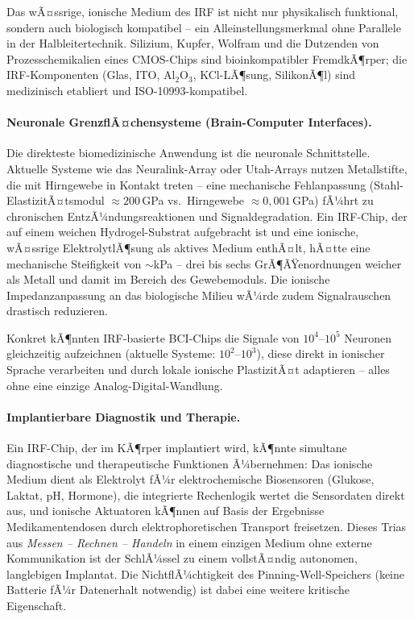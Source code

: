 ﻿\documentclass[a4paper,12pt]{scrreprt}
\theoremstyle{definition}
\begin{document}
Das wÃ¤ssrige, ionische Medium des IRF ist nicht nur physikalisch funktional,
sondern auch biologisch kompatibel -- ein Alleinstellungsmerkmal ohne
Parallele in der Halbleitertechnik. Silizium, Kupfer, Wolfram und die
Dutzenden von Prozesschemikalien eines CMOS-Chips sind bioinkompatibler
FremdkÃ¶rper; die IRF-Komponenten (Glas, ITO, Al$_2$O$_3$, KCl-LÃ¶sung,
SilikonÃ¶l) sind medizinisch etabliert und ISO-10993-kompatibel.

\paragraph{Neuronale GrenzflÃ¤chensysteme (Brain-Computer Interfaces).}
Die direkteste biomedizinische Anwendung ist die neuronale Schnittstelle.
Aktuelle Systeme wie das Neuralink-Array oder Utah-Arrays nutzen Metallstifte,
die mit Hirngewebe in Kontakt treten -- eine mechanische Fehlanpassung
(Stahl-ElastizitÃ¤tsmodul $\approx 200$\,GPa vs.\ Hirngewebe $\approx 0{,}001$\,GPa)
fÃ¼hrt zu chronischen EntzÃ¼ndungsreaktionen und Signaldegradation.
Ein IRF-Chip, der auf einem weichen Hydrogel-Substrat aufgebracht ist und
eine ionische, wÃ¤ssrige ElektrolytlÃ¶sung als aktives Medium enthÃ¤lt,
hÃ¤tte eine mechanische Steifigkeit von $\sim$kPa -- drei bis sechs
GrÃ¶ÃŸenordnungen weicher als Metall und damit im Bereich des Gewebemoduls.
Die ionische Impedanzanpassung an das biologische Milieu wÃ¼rde zudem
Signalrauschen drastisch reduzieren.

Konkret kÃ¶nnten IRF-basierte BCI-Chips die Signale von
$10^4$--$10^5$ Neuronen gleichzeitig aufzeichnen (aktuelle Systeme:
$10^2$--$10^3$), diese direkt in ionischer Sprache verarbeiten
und durch lokale ionische PlastizitÃ¤t adaptieren -- alles ohne eine
einzige Analog-Digital-Wandlung.

\paragraph{Implantierbare Diagnostik und Therapie.}
Ein IRF-Chip, der im KÃ¶rper implantiert wird, kÃ¶nnte simultane diagnostische
und therapeutische Funktionen Ã¼bernehmen: Das ionische Medium dient als
Elektrolyt fÃ¼r elektrochemische Biosensoren (Glukose, Laktat, pH, Hormone),
die integrierte Rechenlogik wertet die Sensordaten direkt aus, und
ionische Aktuatoren kÃ¶nnen auf Basis der Ergebnisse Medikamentendosen
durch elektrophoretischen Transport freisetzen. Dieses Trias
aus \emph{Messen -- Rechnen -- Handeln} in einem einzigen Medium ohne
externe Kommunikation ist der SchlÃ¼ssel zu einem vollstÃ¤ndig autonomen,
langlebigen Implantat. Die NichtflÃ¼chtigkeit des Pinning-Well-Speichers
(keine Batterie fÃ¼r Datenerhalt notwendig) ist dabei eine weitere
kritische Eigenschaft.
\end{document}
